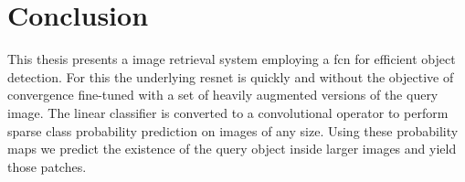 %
\chapter{Conclusion}
\label{sec:conclusion}
This thesis presents a image retrieval system employing a \acrlong{fcn} for efficient object detection. For this the underlying \gls{resnet} is quickly and without the objective of convergence fine-tuned with a set of heavily augmented versions of the query image. The linear classifier is converted to a convolutional operator to perform sparse class probability prediction on images of any size. Using these probability maps we predict the existence of the query object inside larger images and yield those patches.
